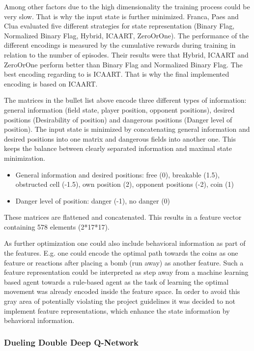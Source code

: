 Among other factors due to the high dimensionality the training process could be very slow. That is why the input state is further minimized.
Franca, Paes and Clua \cite{Franca2019} evaluated five different strategies for state representation (Binary Flag, Normalized Binary Flag, Hybrid, ICAART, ZeroOrOne). The performance of the different encodings is measured by the cumulative rewards during training in relation to the number of episodes. Their results were that Hybrid, ICAART and ZeroOrOne perform better than Binary Flag and Normalized Binary Flag. The best encoding regarding to \cite{Franca2019} is ICAART. That is why the final implemented encoding is based on ICAART.

The matrices in the bullet list above encode three different types of information:
general information (field state, player position, opponent positions), desired positions (Desirability of position) and dangerous positions (Danger level of position).
The input state is minimized by concatenating general information and desired positions into one matrix and dangerous fields into another one. This keeps the balance between clearly separated information and maximal state minimization.

\begin{itemize}
	\item General information and desired positions: free (0), breakable (1.5), obstructed cell (-1.5), own position (2), opponent positions (-2), coin (1)
	\item Danger level of position: danger (-1), no danger (0)
\end{itemize}
These matrices are flattened and concatenated. This results in a feature vector containing 578 elements (2*17*17).

As further optimization one could also include behavioral information as part of the features. E.g. one could encode the optimal path towards the coins as one feature or reactions after placing a bomb (run away) as another feature. Such a feature representation could be interpreted as step away from a machine learning based agent towards a rule-based agent as the task of learning the optimal movement was already encoded inside the feature space. In order to avoid this gray area of potentially violating the project guidelines it was decided to not implement feature representations, which enhance the state information by behavioral information.

\subsubsection{Dueling Double Deep Q-Network}
\label{ch:approachAb}


